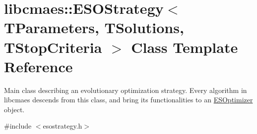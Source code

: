 \hypertarget{classlibcmaes_1_1ESOStrategy}{\section{libcmaes\+:\+:E\+S\+O\+Strategy$<$ T\+Parameters, T\+Solutions, T\+Stop\+Criteria $>$ Class Template Reference}
\label{classlibcmaes_1_1ESOStrategy}
}


Main class describing an evolutionary optimization strategy. Every algorithm in libcmaes descends from this class, and bring its functionalities to an \hyperlink{classlibcmaes_1_1ESOptimizer}{E\+S\+Optimizer} object.  




{\ttfamily \#include $<$esostrategy.\+h$>$}

